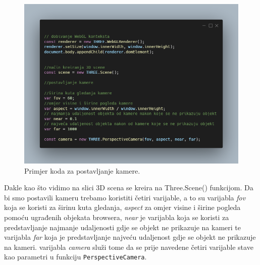 \documentclass[a4paper,12pt]{article}
\begin{document}
\begin{figure}[ht]
    \centering
    \includegraphics[scale=0.5]{image/zadatak1.png}
    \caption{Primjer koda za postavljanje kamere.}
\end{figure}


Dakle kao što vidimo na slici 3D scena se kreira na Three.Scene() funkcijom. Da bi smo postavili kameru trebamo koristiti četiri varijable, a to su 
varijabla \textit{fov} koja se koristi za širinu kuta gledanja, \textit{aspect} za omjer visine i širine pogleda pomoću ugrađenih objekata browsera, \textit{near} je 
varijabla koja se koristi za predstavljanje najmanje udaljenosti gdje se objekt ne prikazuje na kameri te varijabla \textit{far} koja je predstavljanje najveću 
udaljenost gdje se objekt ne prikazuje na kameri.
varijabla \textit{camera} služi tome da se prije navedene četiri varijable stave kao parametri u funkciju \texttt{PerspectiveCamera}.
\end{document}
